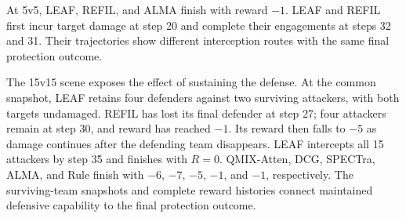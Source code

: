 At 5v5, LEAF, REFIL, and ALMA finish with reward $-1$. LEAF and REFIL first incur target damage at step 20 and complete their engagements at steps 32 and 31. Their trajectories show different interception routes with the same final protection outcome.

The 15v15 scene exposes the effect of sustaining the defense. At the common snapshot, LEAF retains four defenders against two surviving attackers, with both targets undamaged. REFIL has lost its final defender at step 27; four attackers remain at step 30, and reward has reached $-1$. Its reward then falls to $-5$ as damage continues after the defending team disappears. LEAF intercepts all 15 attackers by step 35 and finishes with $R=0$. QMIX-Atten, DCG, SPECTra, ALMA, and Rule finish with $-6$, $-7$, $-5$, $-1$, and $-1$, respectively. The surviving-team snapshots and complete reward histories connect maintained defensive capability to the final protection outcome.



